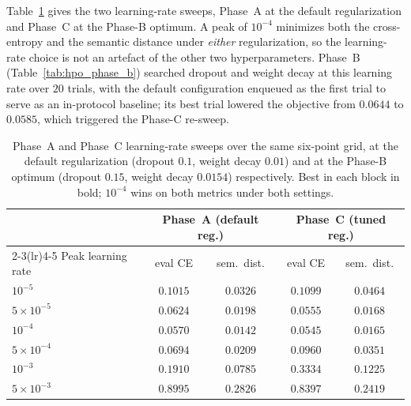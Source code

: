 \documentclass[titlepage,a4paper,11pt]{report}
\begin{document}
    Table~\ref{tab:hpo_lr_grid} gives the two learning-rate sweeps, Phase~A at the default regularization and Phase~C at the Phase-B optimum. A peak of $10^{-4}$ minimizes both the cross-entropy and the semantic distance under \emph{either} regularization, so the learning-rate choice is not an artefact of the other two hyperparameters. Phase~B (Table~\ref{tab:hpo_phase_b}) searched dropout and weight decay at this learning rate over $20$ trials, with the default configuration enqueued as the first trial to serve as an in-protocol baseline; its best trial lowered the objective from $0.0644$ to $0.0585$, which triggered the Phase-C re-sweep.

    \begin{table}[ht]
        \centering
        \caption{Phase~A and Phase~C learning-rate sweeps over the same six-point grid, at the default regularization (dropout $0.1$, weight decay $0.01$) and at the Phase-B optimum (dropout $0.15$, weight decay $0.0154$) respectively. Best in each block in bold; $10^{-4}$ wins on both metrics under both settings.}
        \label{tab:hpo_lr_grid}
        \begin{tabular}{lcccc}
            \toprule
            & \multicolumn{2}{c}{Phase~A (default reg.)} & \multicolumn{2}{c}{Phase~C (tuned reg.)} \\
            \cmidrule(lr){2-3}\cmidrule(lr){4-5}
            Peak learning rate & eval CE & sem.\ dist. & eval CE & sem.\ dist. \\
            \midrule
            $10^{-5}$        & $0.1015$          & $0.0326$          & $0.1099$          & $0.0464$ \\
            $5\times10^{-5}$ & $0.0624$          & $0.0198$          & $0.0555$          & $0.0168$ \\
            $10^{-4}$        & $\mathbf{0.0570}$ & $\mathbf{0.0142}$ & $\mathbf{0.0545}$ & $\mathbf{0.0165}$ \\
            $5\times10^{-4}$ & $0.0694$          & $0.0209$          & $0.0960$          & $0.0351$ \\
            $10^{-3}$        & $0.1910$          & $0.0785$          & $0.3334$          & $0.1225$ \\
            $5\times10^{-3}$ & $0.8995$          & $0.2826$          & $0.8397$          & $0.2419$ \\
            \bottomrule
        \end{tabular}
    \end{table}
\end{document}
